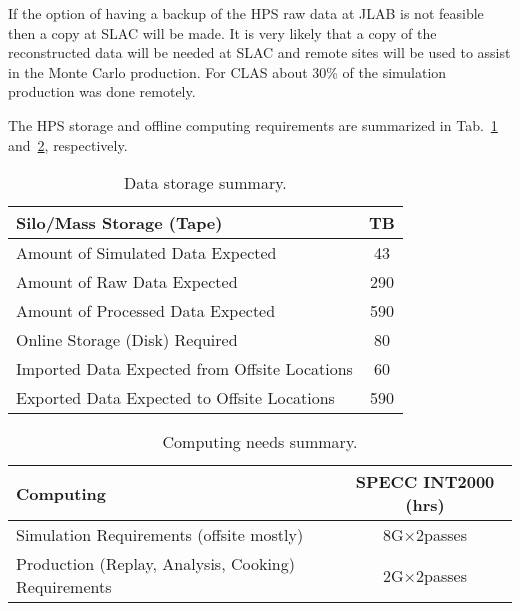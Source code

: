 If the option of having a backup of the HPS raw data at JLAB is not feasible then a copy at SLAC will be made. It is very likely that a copy of the reconstructed data will be needed at SLAC and remote sites will be used to assist in the Monte Carlo production. For CLAS about 30\% of the simulation production was done remotely.


The HPS storage and offline computing requirements are summarized in Tab.~\ref{tab:datastorage} 
and~\ref{tab:computing}, respectively.
\begin{table}[tbp]
\centering
\begin{tabular}{|l|c|}
\hline
Silo/Mass Storage (Tape) & TB \\
\hline
Amount of Simulated Data Expected & 43 \\
\hline
Amount of Raw Data Expected & 290 \\
\hline
Amount of Processed Data Expected & 590 \\
\hline
Online Storage (Disk) Required & 80 \\
\hline
Imported Data Expected from Offsite Locations & 60 \\
\hline
Exported Data Expected to Offsite Locations&590 \\
\hline
\end{tabular}
\caption{{\small Data storage summary.}}
\label{tab:datastorage}
\end{table}
\begin{table}[tbp]
\centering
\begin{tabular}{|l|c|}
\hline
Computing & SPECC INT2000 (hrs) \\
\hline
Simulation Requirements (offsite mostly)&8G$\times$2passes\\
\hline
Production (Replay, Analysis, Cooking) Requirements & 2G$\times$2passes\\
\hline
\end{tabular}
\caption{{\small Computing needs summary.}}
\label{tab:computing}
\end{table}
